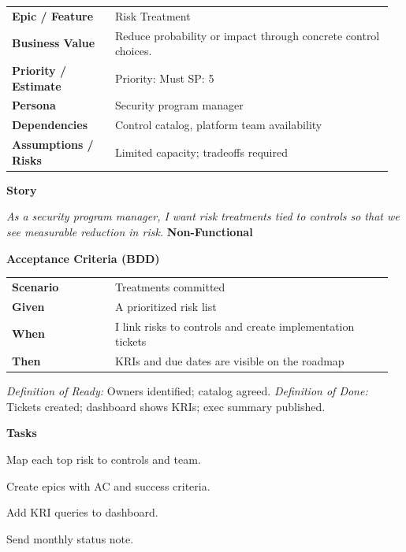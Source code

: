 \documentclass[11pt,letterpaper]{article}
\makeatletter
\newenvironment{kvtable}{%
  \begin{tabular}{@{}>{\bfseries\arraybackslash}p{0.26\linewidth} p{0.70\linewidth}@{}}
}{\end{tabular}}
\newenvironment{bdd}{%
  \begin{tabular}{@{}>{\bfseries\arraybackslash}p{0.26\linewidth} p{0.70\linewidth}@{}}
}{\end{tabular}}
\newcommand{\DoRDoD}[2]{%
  \vspace{0.35em}
  {\footnotesize\color{Muted}%
    \textit{Definition of Ready:} #1 \; \textbullet\;
    \textit{Definition of Done:} #2%
  }%
}
\newenvironment{storycard}[2]{%
  \begin{tcolorbox}[cloudcard, title={#1 --- #2}]%
}{\end{tcolorbox}}
\newcommand{\sectionlabel}[1]{\vspace{0.35em}\textbf{#1}\par}
\makeatother
\begin{document}
\begin{storycard}{CCS-7}{Ch. 7 — Managing Risk in the Cloud}
\begin{kvtable}
Epic / Feature & Risk Treatment\\
Business Value & Reduce probability or impact through concrete control choices.\\
Priority / Estimate & Priority: Must \quad SP: 5\\
Persona & Security program manager\\
Dependencies & Control catalog, platform team availability\\
Assumptions / Risks & Limited capacity; tradeoffs required\\
\end{kvtable}
\sectionlabel{Story}
\textit{As a security program manager, I want risk treatments tied to controls so that we see measurable reduction in risk.}
\sectionlabel{Non-Functional}\;
\sectionlabel{Acceptance Criteria (BDD)}
\begin{bdd}
Scenario & Treatments committed\\
Given & A prioritized risk list\\
When & I link risks to controls and create implementation tickets\\
Then & KRIs and due dates are visible on the roadmap\\
\end{bdd}
\DoRDoD{Owners identified; catalog agreed.}{Tickets created; dashboard shows KRIs; exec summary published.}
\sectionlabel{Tasks}
\begin{checklist}
\item Map each top risk to controls and team.
\item Create epics with AC and success criteria.
\item Add KRI queries to dashboard.
\item Send monthly status note.
\end{checklist}
\end{storycard}
\end{document}
